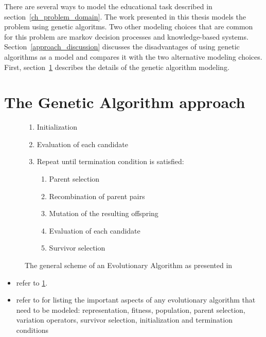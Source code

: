 \label{ch_approach}
There are several ways to model the educational task described in
section~\ref{ch_problem_domain}. The work presented in this thesis models the
problem using genetic algoritms. Two other modeling choices that are common for
this problem are markov decision processes and knowledge-based systems.
Section~\ref{approach_discussion} discusses the disadvantages of using genetic
algorithms as a model and compares it with the two alternative modeling
choices. First, section~\ref{approach_genetic_algorithm} describes the details
of the genetic algorithm modeling.
\section{The Genetic Algorithm approach}
\label{approach_genetic_algorithm}
\begin{figure}[ht!]
	\begin{framed}
		\begin{enumerate}
			\item Initialization
			\item Evaluation of each candidate
			\item Repeat until termination condition is satisfied:
				\begin{enumerate}
					\item Parent selection
					\item Recombination of parent pairs
					\item Mutation of the resulting offspring
					\item Evaluation of each candidate
					\item Survivor selection
				\end{enumerate}
		\end{enumerate}
	\end{framed}
	\caption[The evolutionary algorithm]{The general scheme of an
		Evolutionary Algorithm as presented in \citep{Eiben2007}}
	\label{alg:ea_scheme}
\end{figure}
\begin{itemize}
	\item refer to \ref{alg:ea_scheme}.
	\item refer to \citep{Eiben2007} for listing the important aspects of any evolutionary algorithm that need to be modeled: representation, fitness, population, parent selection, variation operators, survivor selection, initialization and termination conditions
\end{itemize}
